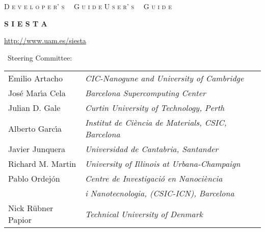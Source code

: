 \begin{titlepage}

\begin{center}

\vspace{1cm}
\ifdeveloper
 {\Huge \textsc{D e v e l o p e r' s \, \, G u i d e}}
\else
 {\Huge \textsc{U s e r' s \, \, G u i d e}}
\fi

\vspace{1cm}
\hrulefill
\vspace{1cm}

{\Huge \textbf{S I E S T A \, \, \softwareversion}}

\vspace{1cm}
\hrulefill
\vspace{0.5cm}

{\Large \printdate}

\vspace{1.5cm}
{\Large \url{http://www.uam.es/siesta}}

\vspace{2.5cm}
\siesta\ Steering Committee:
\vspace{1.0cm}

\begin{tabular}{ll}
  
  Emilio Artacho &
  \textit{CIC-Nanogune and University of Cambridge} \\
  
  Jos\'e Mar\'{\i}a Cela &
  \textit{Barcelona Supercomputing Center} \\
  
  Julian D. Gale &
  \textit{Curtin University of Technology, Perth} \\
  
  Alberto Garc\'{\i}a &
  \textit{Institut de Ci\`encia de Materials, CSIC, Barcelona} \\

  Javier Junquera &
  \textit{Universidad de Cantabria, Santander} \\

  Richard M. Martin &
  \textit{University of Illinois at Urbana-Champaign} \\

  Pablo Ordej\'on &
  \textit{Centre de Investigaci\'o en Nanoci\`encia} \\
  &
  \textit{  i Nanotecnologia, (CSIC-ICN), Barcelona} \\
  
  Nick R\"ubner Papior &
  \textit{Technical University of Denmark} \\
  

\end{tabular}
\end{center}
\end{titlepage}
